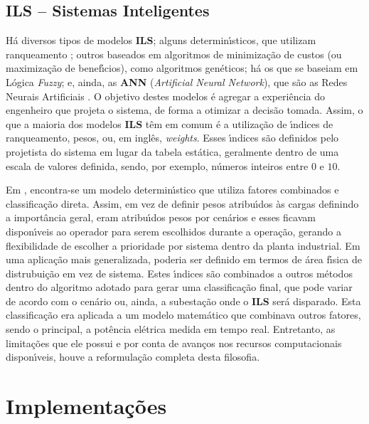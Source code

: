 \subsection{\textbf{ILS} \--- Sistemas Inteligentes} \label{ssec:ils}

H{\'a} diversos tipos de modelos \textbf{ILS}; alguns determin{\'\i}sticos, que utilizam ranqueamento \cite{wang2014, verayiah2015}; outros baseados em algoritmos de minimiza{\c c}{\~a}o de custos (ou maximiza{\c c}{\~a}o de benef{\'\i}cios), como algoritmos gen{\'e}ticos; h{\'a} os que se baseiam em L{\'o}gica \textit{Fuzzy}; e, ainda, as \textbf{ANN} (\textit{Artificial Neural Network}), que s{\~a}o as Redes Neurais Artificiais \cite{yan2017, santos2014}. O objetivo destes modelos \cite{7046661} {\'e} agregar a experi{\^e}ncia do engenheiro que projeta o sistema, de forma a otimizar a decis{\~a}o tomada. Assim, o que a maioria dos modelos \textbf{ILS} t{\^e}m em comum {\'e} a utiliza{\c c}{\~a}o de {\'\i}ndices de ranqueamento, pesos, ou, em ingl{\^e}s, \textit{weights}. Esses {\'\i}ndices s{\~a}o definidos pelo projetista do sistema em lugar da tabela est{\'a}tica, geralmente dentro de uma escala de valores definida, sendo, por exemplo, n{\'u}meros inteiros entre $0$ e $10$.

Em \cite{B574}, encontra-se um modelo determin{\'\i}stico que utiliza fatores combinados e classifica{\c c}{\~a}o direta. Assim, em vez de definir pesos atribu{\'\i}dos {\`a}s cargas definindo a import{\^a}ncia geral, eram atribu{\'\i}dos pesos por cen{\'a}rios e esses ficavam dispon{\'\i}veis ao operador para serem escolhidos durante a opera{\c c}{\~a}o, gerando a flexibilidade de escolher a prioridade por sistema dentro da planta industrial. Em uma aplica{\c c}{\~a}o mais generalizada, poderia ser definido em termos de {\'a}rea f{\'\i}sica de distrubui{\c c}{\~a}o em vez de sistema.  Estes {\'\i}ndices s{\~a}o combinados a outros m{\'e}todos dentro do algoritmo adotado para gerar uma classifica{\c c}{\~a}o final, que pode variar de acordo com o cen{\'a}rio ou, ainda, a subesta{\c c}{\~a}o onde o \textbf{ILS} ser{\'a} disparado. Esta classifica{\c c}{\~a}o era aplicada a um modelo matem{\'a}tico que combinava outros fatores, sendo o principal, a pot{\^e}ncia el{\'e}trica medida em tempo real. Entretanto, as limita{\c c}{\~o}es que ele possui e por conta de avan{\c c}os nos recursos computacionais dispon{\'\i}veis, houve a reformula{\c c}{\~a}o completa desta filosofia.

\section{Implementa{\c c}{\~o}es} \label{sec:casos}

